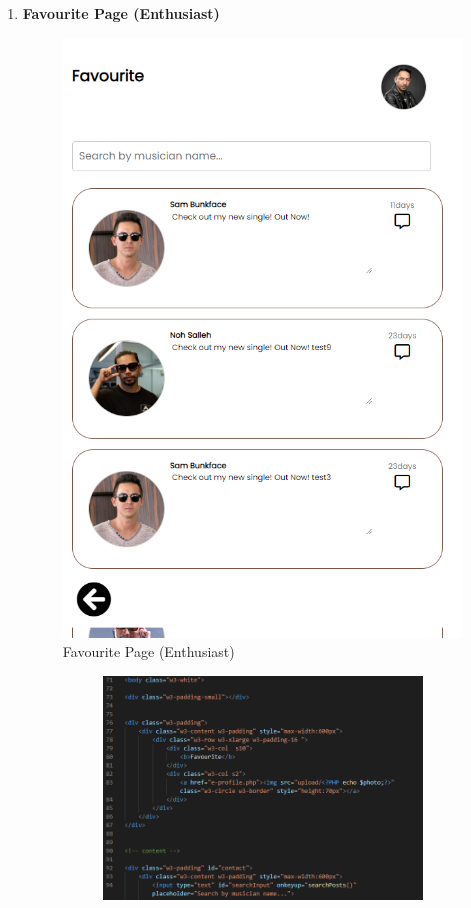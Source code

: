\begin{enumerate}[1.]
    \item \textbf{Favourite Page (Enthusiast)}
    \begin{figure}[h]
        \centering
        \includegraphics[width=0.5\linewidth]{mainmatter/images/frontend/ss/Favourite (Enthusiast).png}
        \caption{Favourite Page (Enthusiast)}
        \label{fig:myfig69}
    \end{figure}
    \begin{figure}[h]\ContinuedFloat
        \centering
        \begin{subfigure}[b]{0.7\textwidth}
            \centering
            \includegraphics[width=\textwidth]{mainmatter/images/frontend/code/efav.png}
            \label{fig:sub1}
        \end{subfigure}
        \hspace{0.04\textwidth}

\end{figure}
\end{enumerate}

